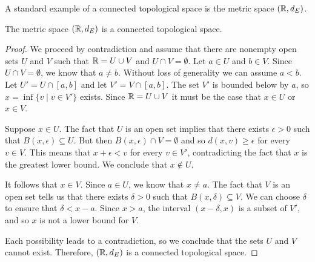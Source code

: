 \begin{comment}

\ActivitySolution

\ba
\item The set $X = A \cup (X \setminus A)$ expresses $X$ as a disjoint union of two subsets. Since $X$ is connected, $A$ cannot be a proper subset of $X$, so $A = \emptyset$ or $A = X$.

\item Suppose that $A$ and $B$ are disjoint open subsets of $X$ such that $X = A \cup B$. It follows that $B = X \setminus A$ and so $A$ is closed. Since $A$ is both open and closed, we can conclude that $A = \emptyset$ or $A = X$. This implies that there are no proper disjoint open subsets of $X$ whose union is $X$. Therefore, $X$ is connected. 

\item The appropriate theorem is

\noindent \textbf{Theorem.} A topological space $(X, \tau)$ is connected if and only if the only sets that are both open and closed in $X$ are $\emptyset$ and $X$. 

\ea

\end{comment}

A standard example of a connected topological space is the metric space $(\mathbb{R}, d_E)$. 

\begin{theorem} \label{thm:R_connected} The metric space $(\mathbb{R}, d_E)$ is a connected topological space.
\end{theorem}

\begin{proof} We proceed by contradiction and assume that there are nonempty open sets $U$ and $V$ such that $\mathbb{R} = U \cup V$ and $U \cap V = \emptyset$. Let $a \in U$ and $b \in V$. Since $U \cap V = \emptyset$, we know that $a \neq b$. Without loss of generality we can assume $a < b$. Let $U' = U \cap [a,b]$ and let $V' = V \cap [a,b]$. The set $V'$ is bounded below by $a$, so $x = \inf\{v \mid v \in V'\}$ exists. Since $\mathbb{R} = U \cup V$ it must be the case that $x \in U$ or $x \in V$. 

Suppose $x \in U$. The fact that $U$ is an open set implies that there exists $\epsilon > 0$ such that $B(x, \epsilon) \subseteq U$. But then $B(x, \epsilon) \cap V = \emptyset$ and so $d(x,v) \geq \epsilon$ for every $v \in V$. This means that $x+\epsilon < v$ for every $v \in V'$, contradicting the fact that $x$ is the greatest lower bound. We conclude that $x \notin U$.

It follows that $x \in V$. Since $a \in U$, we know that $x \neq a$. The fact that $V$ is an open set tells us that there exists $\delta > 0$ such that $B(x, \delta) \subseteq V$. We can choose $\delta$ to ensure that $\delta < x-a$. Since $x > a$, the interval $(x-\delta, x)$ is a subset of $V'$, and so $x$ is not a lower bound for $V$. 

Each possibility leads to a contradiction, so we conclude that the sets $U$ and $V$ cannot exist. Therefore, $(\mathbb{R}, d_E)$ is a connected topological space. 
\end{proof}

